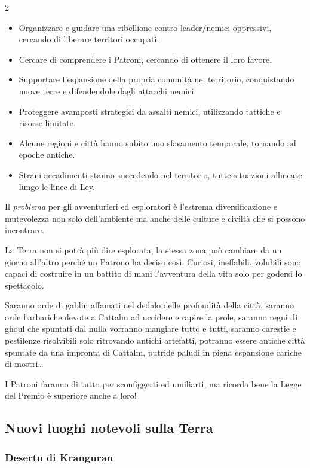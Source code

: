 \begin{multicols}{2}
\begin{itemize}[leftmargin=*]
\item Organizzare e guidare una ribellione contro leader/nemici oppressivi, cercando di liberare territori occupati.
\item Cercare di comprendere i Patroni, cercando di ottenere il loro favore.
\item Supportare l'espansione della propria comunità nel territorio, conquistando nuove terre e difendendole dagli attacchi nemici.
\item Proteggere avamposti strategici da assalti nemici, utilizzando tattiche e risorse limitate.
\item Alcune regioni e città hanno subito uno sfasamento temporale, tornando ad epoche antiche.
\item Strani accadimenti stanno succedendo nel territorio, tutte situazioni allineate lungo le linee di Ley.
\end{itemize}

Il \emph{problema} per gli avventurieri ed esploratori è l'estrema diversificazione e mutevolezza non solo dell'ambiente ma anche delle culture e civiltà che si possono incontrare.

La Terra non si potrà più dire esplorata, la stessa zona può cambiare da un giorno all'altro perché un Patrono ha deciso così. Curiosi, ineffabili, volubili sono capaci di costruire in un battito di mani l'avventura della vita solo per godersi lo spettacolo.

Saranno orde di gablin affamati nel dedalo delle profondità della città, saranno orde barbariche devote a Cattalm ad uccidere e rapire la prole, saranno regni di ghoul che spuntati dal nulla vorranno mangiare tutto e tutti, saranno carestie e pestilenze risolvibili solo ritrovando antichi artefatti, potranno essere antiche città spuntate da una impronta di Cattalm, putride paludi in piena espansione cariche di mostri…

I Patroni faranno di tutto per sconfiggerti ed umiliarti, ma ricorda bene la Legge del Premio è superiore anche a loro!

\subsection{Nuovi luoghi notevoli sulla Terra}\label{luoghinotevoli}

\subsubsection{Deserto di Kranguran}


\end{multicols}
